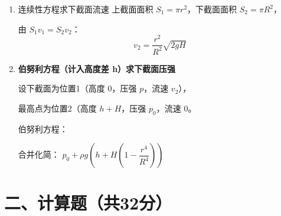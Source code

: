 \documentclass[11pt,a4paper]{article}
\begin{document}
\begin{enumerate}
\begin{enumerate}
    \item 连续性方程求下截面流速
    上截面面积 \( S_1 = \pi r^2 \)，下截面面积 \( S_2 = \pi R^2 \)，
    
    由 \( S_1 v_1 = S_2 v_2 \)：
    \[
    v_2 = \frac{r^2}{R^2} \sqrt{2gH}
    \]

     \item \textbf{伯努利方程（计入高度差 h）求下截面压强}
    
     设下截面为位置1（高度 \( 0 \)，压强 \( p \)，流速 \( v_2 \)），
    
     最高点为位置2（高度 \( h+H \)，压强 \( p_0 \)，流速 0。
    
     伯努利方程：

    合并化简：
     \( p_0 + \rho g \left( h + H\left(1 - \dfrac{r^4}{R^4}\right) \right) \)

\end{enumerate}
\end{enumerate}

\section*{二、计算题（共32分）}
\end{document}
